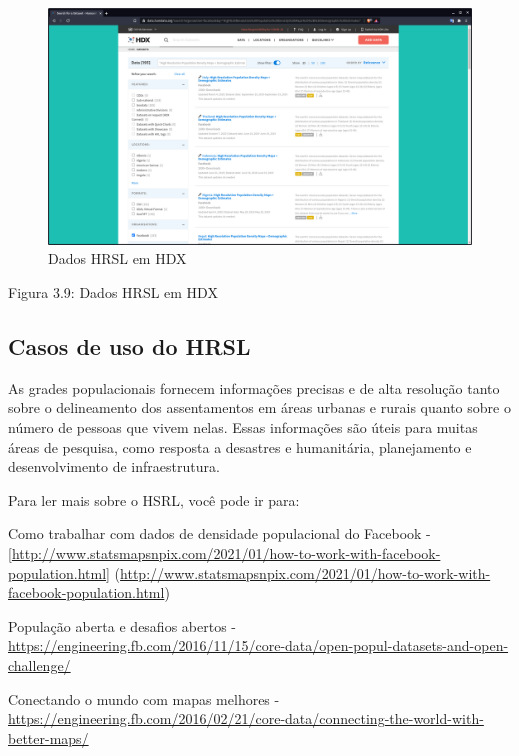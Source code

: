 \documentclass[
  portuguese,
]{krantz}
\begin{document}
\begin{figure}
\centering
\includegraphics{media/modulo3/hdx.png}
\caption{Dados HRSL em HDX}
\end{figure}

Figura 3.9: Dados HRSL em HDX

\hypertarget{casos-de-uso-do-hrsl}{%
\subsection{\texorpdfstring{\textbf{Casos de uso do HRSL}}{Casos de uso do HRSL}}\label{casos-de-uso-do-hrsl}}

As grades populacionais fornecem informações precisas e de alta resolução tanto sobre o delineamento dos assentamentos em áreas urbanas e rurais quanto sobre o número de pessoas que vivem nelas. Essas informações são úteis para muitas áreas de pesquisa, como resposta a desastres e humanitária, planejamento e desenvolvimento de infraestrutura.

Para ler mais sobre o HSRL, você pode ir para:

Como trabalhar com dados de densidade populacional do Facebook - {[}\url{http://www.statsmapsnpix.com/2021/01/how-to-work-with-facebook-population.html}{]} (\url{http://www.statsmapsnpix.com/2021/01/how-to-work-with-facebook-population.html})

População aberta e desafios abertos - \href{https://engineering.fb.com/2016/11/15/core-data/open-population-datasets-and-open-desafios/}{https://engineering.fb.com/2016/11/15/core-data/open-popul-datasets-and-open-challenge/}

Conectando o mundo com mapas melhores - \href{https://engineering.fb.com/2016/02/21/core-data/Connecting-the-world-with-better-maps/}{https://engineering.fb.com/2016/02/21/core-data/connecting-the-world-with-better-maps/}
\end{document}

